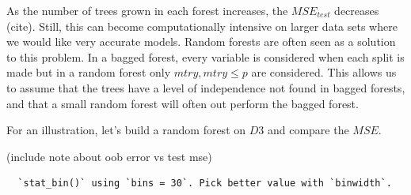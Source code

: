 \documentclass[12pt,twoside]{reedthesis}
\begin{document}
  As the number of trees grown in each forest increases, the
  \(MSE_{test}\) decreases (cite). Still, this can become computationally
  intensive on larger data sets where we would like very accurate models.
  Random forests are often seen as a solution to this problem. In a bagged
  forest, every variable is considered when each split is made but in a
  random forest only \(mtry, mtry \leq p\) are considered. This allows us
  to assume that the trees have a level of independence not found in
  bagged forests, and that a small random forest will often out perform
  the bagged forest.
  
  For an illustration, let's build a random forest on \(D3\) and compare
  the \(MSE\).
  
  (include note about oob error vs test mse)
  
  \begin{Shaded}
  \begin{Highlighting}[]
  \StringTok{ }\NormalTok{(}\NormalTok{,}\NormalTok{)}
  \StringTok{ }\NormalTok{(}\NormalTok{,}\NormalTok{)}
  \NormalTok{:}\NormalTok{)\{}
    \StringTok{ }   \NormalTok{)}
    \StringTok{ }\StringTok{ }\NormalTok{)}
  \NormalTok{\}}
  
  \StringTok{ }
  
  \NormalTok{(}\NormalTok{(}  \StringTok{ }\NormalTok{()}
  \end{Highlighting}
  \end{Shaded}
  
  \begin{verbatim}
  `stat_bin()` using `bins = 30`. Pick better value with `binwidth`.
  \end{verbatim}
  
\end{document}
